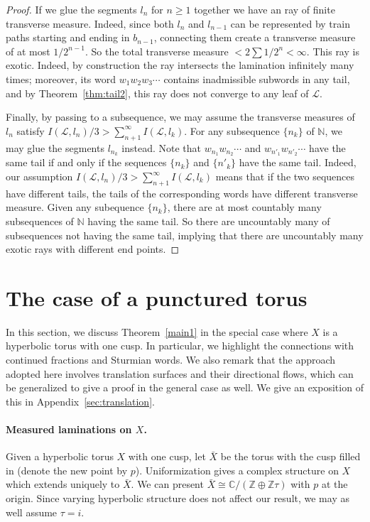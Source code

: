 \documentclass[11pt]{article} %
\theoremstyle{plain}
\theoremstyle{definition}
\numberwithin{equation}{section}
\begin{document}
\begin{proof}
If we glue the segments $l_n$ for $n\ge1$ together we have an ray of finite transverse measure. Indeed, since both $l_n$ and $l_{n-1}$ can be represented by train paths starting and ending in $b_{n-1}$, connecting them create a transverse measure of at most $1/2^{n-1}$. So the total transverse measure $<2\sum1/2^{n}<\infty$. This ray is exotic. Indeed, by construction the ray intersects the lamination infinitely many times; moreover, its word $w_1w_2w_3\cdots$ contains inadmissible subwords in any tail, and by Theorem~\ref{thm:tail2}, this ray does not converge to any leaf of $\mathcal{L}$.

Finally, by passing to a subsequence, we may assume the transverse measures of $l_n$ satisfy $I(\mathcal{L},l_n)/3>\sum_{n+1}^\infty I(\mathcal{L},l_k)$. For any subsequence $\{n_k\}$ of $\mathbb{N}$, we may glue the segments $l_{n_k}$ instead. Note that $w_{n_1}w_{n_2}\cdots$ and $w_{n'_1}w_{n'_2}\cdots$ have the same tail if and only if the sequences $\{n_k\}$ and $\{n'_k\}$ have the same tail. Indeed, our assumption $I(\mathcal{L},l_n)/3>\sum_{n+1}^\infty I(\mathcal{L},l_k)$ means that if the two sequences have different tails, the tails of the corresponding words have different transverse measure. Given any subequence $\{n_k\}$, there are at most countably many subsequences of $\mathbb{N}$ having the same tail. So there are uncountably many of subsequences not having the same tail, implying that there are uncountably many exotic rays with different end points.
\end{proof}

\section{The case of a punctured torus}\label{sec:tori}
In this section, we discuss Theorem~\ref{main1} in the special case where $X$ is a hyperbolic torus with one cusp. In particular, we highlight the connections with continued fractions and Sturmian words. We also remark that the approach adopted here involves translation surfaces and their directional flows, which can be generalized to give a proof in the general case as well. We give an exposition of this in Appendix~\ref{sec:translation}.

\paragraph{Measured laminations on $X$.}
Given a hyperbolic torus $X$ with one cusp, let $\bar X$ be the torus with the cusp filled in (denote the new point by $p$). Uniformization gives a complex structure on $X$ which extends uniquely to $\bar X$. We can present $\bar X\cong\mathbb{C}/(\mathbb{Z}\oplus\mathbb{Z}\tau)$ with $p$ at the origin. Since varying hyperbolic structure does not affect our result, we may as well assume $\tau=i$.
\end{document}
